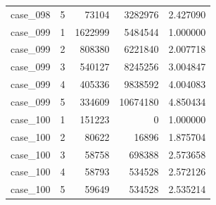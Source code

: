 \begin{longtable}{lrrrr}
case\_098 & 5 & 73104 & 3282976 & 2.427090 \\
case\_099 & 1 & 1622999 & 5484544 & 1.000000 \\
case\_099 & 2 & 808380 & 6221840 & 2.007718 \\
case\_099 & 3 & 540127 & 8245256 & 3.004847 \\
case\_099 & 4 & 405336 & 9838592 & 4.004083 \\
case\_099 & 5 & 334609 & 10674180 & 4.850434 \\
case\_100 & 1 & 151223 & 0 & 1.000000 \\
case\_100 & 2 & 80622 & 16896 & 1.875704 \\
case\_100 & 3 & 58758 & 698388 & 2.573658 \\
case\_100 & 4 & 58793 & 534528 & 2.572126 \\
case\_100 & 5 & 59649 & 534528 & 2.535214 \\
\bottomrule
\end{longtable}
